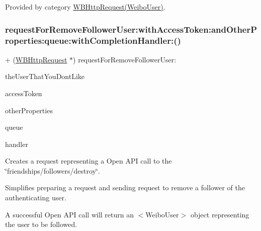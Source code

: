 Provided by category \mbox{\hyperlink{category_w_b_http_request_07_weibo_user_08_abb1e37b606f28ab890279b1ce62de963}{W\+B\+Http\+Request(\+Weibo\+User)}}.

\mbox{\label{interface_w_b_http_request_abb1e37b606f28ab890279b1ce62de963}} 
\subsubsection{\texorpdfstring{request\+For\+Remove\+Follower\+User\+:with\+Access\+Token\+:and\+Other\+Properties\+:queue\+:with\+Completion\+Handler\+:()}{requestForRemoveFollowerUser:withAccessToken:andOtherProperties:queue:withCompletionHandler:()}\hspace{0.1cm}{\footnotesize\ttfamily [2/3]}}
{\footnotesize\ttfamily + (\mbox{\hyperlink{interface_w_b_http_request}{W\+B\+Http\+Request}} $\ast$) request\+For\+Remove\+Follower\+User\+: \begin{DoxyParamCaption}\item[{(N\+S\+String $\ast$)}]{the\+User\+That\+You\+Dont\+Like }\item[{withAccessToken:(N\+S\+String $\ast$)}]{access\+Token }\item[{andOtherProperties:(N\+S\+Dictionary $\ast$)}]{other\+Properties }\item[{queue:(N\+S\+Operation\+Queue $\ast$)}]{queue }\item[{withCompletionHandler:(W\+B\+Request\+Handler)}]{handler }\end{DoxyParamCaption}}

Creates a request representing a Open A\+PI call to the \char`\"{}friendships/followers/destroy\char`\"{}.

Simplifies preparing a request and sending request to remove a follower of the authenticating user.

A successful Open A\+PI call will return an $<$\+Weibo\+User$>$ object representing the user to be followed.

